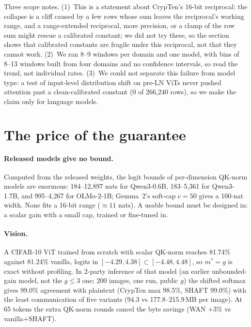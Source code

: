 \documentclass[11pt]{article}
\newcommand{\mstar}{m^{*}}
\begin{document}
Three scope notes. (1)~This is a statement about CrypTen's 16-bit reciprocal: the collapse is a cliff caused by a few rows whose sum leaves the
reciprocal's working range, and a range-extended reciprocal, more precision, or a clamp of the row sum might
rescue a calibrated constant; we did not try these, so the section shows that calibrated constants are fragile under this
reciprocal, not that they cannot work. (2)~We ran 8--9 windows per domain and one model, with bins of 8--13 windows built from four domains and no
confidence intervals, so read the trend, not individual rates. (3)~We could not separate this failure from model type: a test of input-level distribution shift on pre-LN ViTs
never pushed attention past a clean-calibrated constant (0 of 266,240 rows), so we make the claim
only for language models.

\section{The price of the guarantee}\label{sec:accuracy}
\paragraph{Released models give no bound.} Computed from the released weights, the logit bounds of per-dimension QK-norm models are
enormous: 184--12,897 nats for Qwen3-0.6B,
183--5,361 for Qwen3-1.7B, and 995--4,267 for OLMo-2-1B; Gemma~2's soft-cap $c=50$ gives a 100-nat width.
None fits a 16-bit range ($\approx 11$ nats). A usable bound must be designed in: a scalar gain
with a small cap, trained or fine-tuned in.

\paragraph{Vision.} A CIFAR-10 ViT trained from scratch with scalar QK-norm reaches 81.74\% against
81.24\% vanilla, logits in $[-4.29,4.38]\subset[-4.48,4.48]$, so $\mstar=g$ is exact without profiling.
In 2-party inference of that model (an earlier unbounded-gain model, not the $g\le3$ one; 200 images, one run, public $g$) the shifted softmax gives 99.0\% agreement with
plaintext (CrypTen max 98.5\%, SHAFT 99.0\%) with the least communication of five variants (94.3 vs 177.8--215.9\,MB per image).
At 65 tokens the extra QK-norm rounds cancel the byte savings (WAN $+3\%$ vs vanilla+SHAFT).
\end{document}

